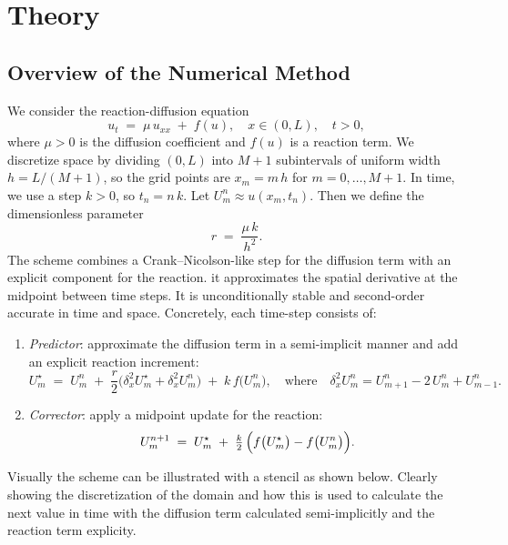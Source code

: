\section{Theory}

\subsection{Overview of the Numerical Method}

We consider the reaction-diffusion equation
\[
  u_t \;=\; \mu\,u_{xx} \;+\; f(u),
  \quad x \in (0,L),\quad t>0,
\]
where \(\mu > 0\) is the diffusion coefficient and \(f(u)\) is a reaction term. We discretize
space by dividing \((0,L)\) into \(M+1\) subintervals of uniform width \(h = L/(M+1)\), so
the grid points are \(x_m = m\,h\) for \(m = 0,\dots,M+1\). In time, we use a step \(k>0\),
so \(t_n = n\,k\). Let \(U_m^n \approx u(x_m,t_n)\). Then we define the dimensionless
parameter
\[
  r \;=\; \frac{\mu\,k}{h^2}.
\]
The scheme combines a Crank–Nicolson-like step for the diffusion term with an explicit
component for the reaction. it approximates the spatial derivative at the midpoint between time steps.
It is unconditionally stable and second-order accurate in time and space. Concretely, each time-step consists of:

\begin{enumerate}
  \item \emph{Predictor}: approximate the diffusion term in a semi-implicit manner and
        add an explicit reaction increment:
        \[
          U_m^\star
          \;=\; U_m^n
          \;+\; \frac{r}{2}\bigl(\delta_x^2 U_m^\star + \delta_x^2 U_m^n\bigr)
          \;+\; k\,f\bigl(U_m^n\bigr), \quad \text{where} \quad \delta_x^2 U_m^n = U_{m+1}^n - 2\,U_m^n + U_{m-1}^n.
        \]
  \item \emph{Corrector}: apply a midpoint update for the reaction:
        \[
          U_m^{n+1}
          \;=\; U_m^\star
          \;+\; \tfrac{k}{2}\,\Bigl(f\bigl(U_m^\star\bigr) - f\bigl(U_m^n\bigr)\Bigr).
        \]
\end{enumerate}
Visually the scheme can be illustrated with a stencil as shown below. Clearly showing the discretization of
the domain and how this is used to calculate the next value in time with the diffusion term calculated
semi-implicitly and the reaction term explicity.

